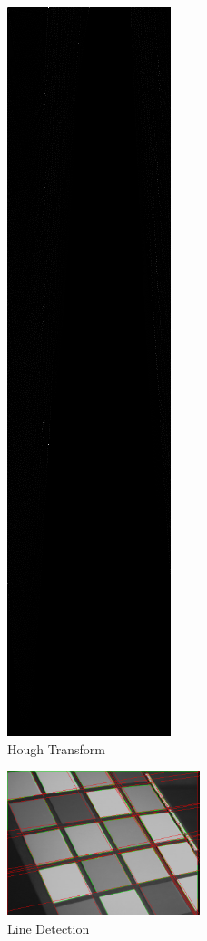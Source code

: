 \begin{figure}[h]
  \includegraphics*[height=0.5\textwidth]{01-hough.png}
  \caption{Hough Transform}
  \label{fig:hough}
\end{figure}

\begin{figure}[h]
  \includegraphics*[width=0.5\textwidth]{01-lines.png}
  \caption{Line Detection}
  \label{fig:lines}
\end{figure}
